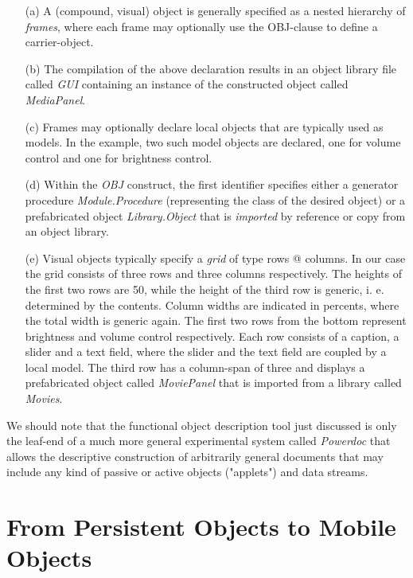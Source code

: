\begin{itemize}

\item[(a)]
A (compound, visual) object is generally specified as a nested hierarchy
of {\em frames\/}, where each frame may optionally use the OBJ-clause
to define a carrier-object.

\item[(b)]
The compilation of the above declaration results in an object library file
called {\em GUI\/} containing an instance of the constructed
object called {\em MediaPanel\/}.

\item[(c)]
Frames may optionally declare local objects that are typically used as
models. In the example, two such model objects are declared, one for
volume control and one for brightness control.

\item[(d)]
Within the {\em OBJ\/} construct, the first identifier specifies either
a generator procedure {\em Module.Procedure\/} (representing the
class of the desired object) or a prefabricated object
{\em Library.Object\/} that is {\em imported\/} by reference or copy
from an object library.

\item[(e)]
Visual objects typically specify a {\em grid\/} of type rows @ columns.
In our case the grid consists of three rows and three columns respectively.
The heights of the first two rows are 50, while the height of the third row
is generic, i. e. determined by the contents. Column widths are indicated
in percents, where the total width is generic again.
The first two rows from the
bottom represent brightness and volume control respectively. Each row
consists of a caption, a slider and a text field, where the slider and the
text
field are coupled by a local model. The third row has a column-span of three
and displays a prefabricated object called {\em MoviePanel} that is imported
from a library called {\em Movies}.

\end{itemize}

We should note that the functional object description tool just discussed
is only the leaf-end of a much more general experimental system called
{\em Powerdoc\/} that allows the descriptive construction
of arbitrarily general documents that may include any kind
of passive or active objects ("applets") and data streams.
 
\section{From Persistent Objects to Mobile Objects}

